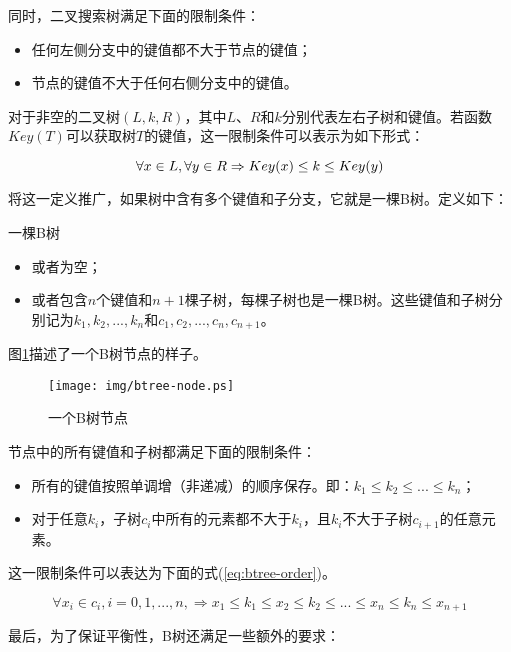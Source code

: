 \documentclass{ctexart}
\begin{document}
同时，二叉搜索树满足下面的限制条件：
\begin{itemize}
\item 任何左侧分支中的键值都不大于节点的键值；
\item 节点的键值不大于任何右侧分支中的键值。
\end{itemize}

对于非空的二叉树$(L, k, R)$，其中$L$、$R$和$k$分别代表左右子树和键值。若函数$Key(T)$可以获取树$T$的键值，这一限制条件可以表示为如下形式：

\begin{equation}
\forall x \in L, \forall y \in R \\
\Rightarrow Key(x) \leq k \leq Key(y)
\end{equation}

将这一定义推广，如果树中含有多个键值和子分支，它就是一棵B树。定义如下：

一棵B树
\begin{itemize}
\item 或者为空；
\item 或者包含$n$个键值和$n+1$棵子树，每棵子树也是一棵B树。这些键值和子树分别记为$k_1, k_2, ..., k_n$和$c_1, c_2, ..., c_n, c_{n+1}$。
\end{itemize}

图\ref{fig:btree-node}描述了一个B树节点的样子。

\begin{figure}[htbp]
  \centering
	\texttt{[image: img/btree-node.ps]}
  \caption{一个B树节点} \label{fig:btree-node}
\end{figure}

节点中的所有键值和子树都满足下面的限制条件：

\begin{itemize}
\item 所有的键值按照单调增（非递减）的顺序保存。即：$k_1 \leq k_2 \leq ... \leq k_n$；
\item 对于任意$k_i$，子树$c_i$中所有的元素都不大于$k_i$，且$k_i$不大于子树$c_{i+1}$的任意元素。
\end{itemize}

这一限制条件可以表达为下面的式(\ref{eq:btree-order})。

\begin{equation}
\forall x_i \in c_i, i=0, 1, ..., n, \Rightarrow x_1 \leq k_1 \leq
x_2 \leq k_2 \leq ... \leq x_n \leq k_n \leq x_{n+1}
\label{eq:btree-order}
\end{equation}

最后，为了保证平衡性，B树还满足一些额外的要求：
\end{document}
